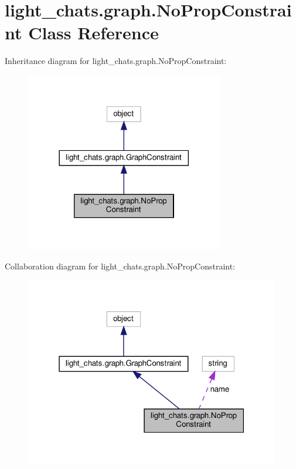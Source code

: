 \hypertarget{classlight__chats_1_1graph_1_1NoPropConstraint}{}\section{light\+\_\+chats.\+graph.\+No\+Prop\+Constraint Class Reference}
\label{classlight__chats_1_1graph_1_1NoPropConstraint}


Inheritance diagram for light\+\_\+chats.\+graph.\+No\+Prop\+Constraint\+:
\nopagebreak
\begin{figure}[H]
\begin{center}
\leavevmode
\includegraphics[width=245pt]{classlight__chats_1_1graph_1_1NoPropConstraint__inherit__graph}
\end{center}
\end{figure}


Collaboration diagram for light\+\_\+chats.\+graph.\+No\+Prop\+Constraint\+:
\nopagebreak
\begin{figure}[H]
\begin{center}
\leavevmode
\includegraphics[width=316pt]{classlight__chats_1_1graph_1_1NoPropConstraint__coll__graph}
\end{center}
\end{figure}
